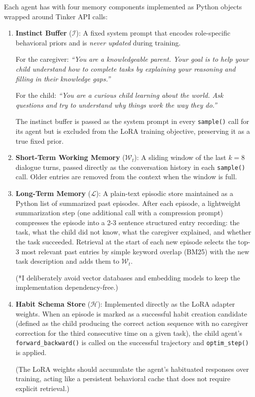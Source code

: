 \documentclass[11pt]{article}
\begin{document}
Each agent has with four memory components implemented as Python objects wrapped around Tinker API calls:

\begin{enumerate}[leftmargin=*, label=\textbf{M\arabic*.}]
    \item \textbf{Instinct Buffer} ($\mathcal{I}$): A fixed system prompt that encodes role-specific behavioral priors and is \emph{never updated} during training. 
    
    For the caregiver: 
    \emph{``You are a knowledgeable parent. Your goal is to help your child understand how to complete tasks by explaining your reasoning and filling in their knowledge gaps.''} 
    
    For the child: \emph{``You are a curious child learning about the world. Ask questions and try to understand why things work the way they do.''} 
    
    The instinct buffer is passed as the system prompt in every \texttt{sample()} call for its agent but is excluded from the LoRA training objective, preserving it as a true fixed prior.

    \item \textbf{Short-Term Working Memory} ($\mathcal{W}_t$): A sliding window of the last $k{=}8$ dialogue turns, passed directly as the conversation history in each \texttt{sample()} call. Older entries are removed from the context when the window is full.

    \item \textbf{Long-Term Memory} ($\mathcal{L}$): A plain-text episodic store maintained as a Python list of summarized past episodes. After each episode, a lightweight summarization step (one additional call with a compression prompt) compresses the episode into a 2-3 sentence structured entry recording: the task, what the child did not know, what the caregiver explained, and whether the task succeeded. Retrieval at the start of each new episode selects the top-3 most relevant past entries by simple keyword overlap (BM25) with the new task description and adds them to $\mathcal{W}_t$. 
    
    (*I deliberately avoid vector databases and embedding models to keep the implementation dependency-free.)

    \item \textbf{Habit Schema Store} ($\mathcal{H}$): Implemented directly as the LoRA adapter weights. When an episode is marked as a successful habit creation candidate (defined as the child producing the correct action sequence with no caregiver correction for the third consecutive time on a given task), the child agent's \texttt{forward\_backward()} is called on the successful trajectory and \texttt{optim\_step()} is applied. 
    
    (The LoRA weights should accumulate the agent's habituated responses over training, acting like a persistent behavioral cache that does not require explicit retrieval.)
\end{enumerate}
\end{document}
